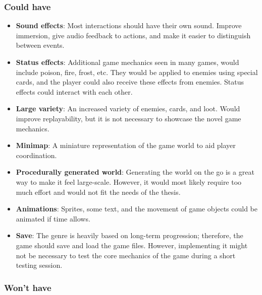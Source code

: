\subsubsection{Could have}

\begin{itemize}
    \item \textbf{Sound effects}: Most interactions should have their own sound. Improve immersion, give audio feedback to actions, and make it easier to distinguish between events.
    \item \textbf{Status effects}: Additional game mechanics seen in many games, would include poison, fire, frost, etc. They would be applied to enemies using special cards, and the player could also receive these effects from enemies. Status effects could interact with each other.
    \item \textbf{Large variety}: An increased variety of enemies, cards, and loot. Would improve replayability, but it is not necessary to showcase the novel game mechanics.
    \item \textbf{Minimap}: A miniature representation of the game world to aid player coordination.
    \item \textbf{Procedurally generated world}: Generating the world on the go is a great way to make it feel large-scale. However, it would most likely require too much effort and would not fit the needs of the thesis.
    \item \textbf{Animations}: Sprites, some text, and the movement of game objects could be animated if time allows.
    \item \textbf{Save}: The genre is heavily based on long-term progression; therefore, the game should save and load the game files. However, implementing it might not be necessary to test the core mechanics of the game during a short testing session.
\end{itemize}

\subsubsection{Won't have}

